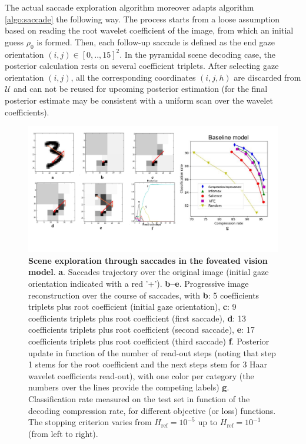 \documentclass[12pt,twoside,openright]{article}
\begin{document}
The actual saccade exploration algorithm moreover adapts algorithm \ref{algo:saccade} the following way. The process starts from a loose assumption based on reading the root wavelet coefficient of the image, from which an initial guess $\rho_0$ is formed. Then, each follow-up saccade is {\color{Purple} defined as the end gaze orientation} $(i,j) \in [0,..,15]^2$. {\color{Purple}In the pyramidal scene decoding case}, the posterior calculation rests on several coefficient triplets. After selecting gaze orientation $(i,j)$, all the corresponding coordinates $(i,j,h)$ are discarded from $\mathcal{U}$ and can not be reused for upcoming posterior estimation (for the final posterior estimate may be consistent with a uniform scan over the wavelet coefficients). 

\begin{figure}[b!]
	\centerline{
		\includegraphics[width=\linewidth]{img/frontiers-saccade.pdf}}
	\vspace{-.2cm}
	\caption{\textbf{Scene exploration through saccades in the foveated vision model}. \textbf{a}. Saccades trajectory over the original image (initial gaze orientation indicated with a red '+'). \textbf{b--e}. Progressive image reconstruction over the course of saccades, with \textbf{b}: 5 coefficients triplets plus root coefficient (initial gaze orientation), \textbf{c}: 9 coefficients triplets plus root coefficient (first saccade), \textbf{d}: 13 coefficients triplets plus root coefficient (second saccade), \textbf{e}: 17 coefficients triplets plus root coefficient (third saccade) \textbf{f}. Posterior update in function of the number of read-out steps (noting that step 1 stems for the root coefficient and the next steps stem for 3 Haar wavelet coefficients read-out), with one color per category (the numbers over the lines provide the competing labels) \textbf{g}.  Classification rate measured on the test set in function of the decoding compression rate, for different objective (or loss) functions. The stopping criterion varies from $H_\text{ref}=10^{-5}$ up to  $H_\text{ref}=10^{-1}$ (from left to right).}\label{fig:foveated-saccades}
\end{figure}
\end{document}
